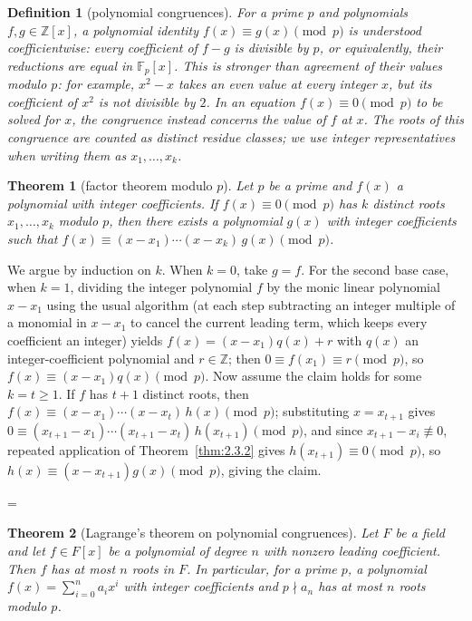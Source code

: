 \documentclass[11pt]{article}
\makeatletter
\theoremstyle{ntstyle}
\newtheorem{theorem}{Theorem}[subsection]
\newtheorem{definition}{Definition}[subsection]
\let\nt@closedisplay\]
\def\nt@guardedclose{\@ifnextchar\par{\nt@closeafterpar}{\@ifnextchar\end{\postdisplaypenalty\@M\nt@closedisplay}{\nt@closedisplay}}}
\def\nt@closeafterpar\par{\@ifnextchar\par{\nt@closeafterpar}{\@ifnextchar\end{\postdisplaypenalty\@M\nt@closedisplay\par}{\nt@closedisplay\par}}}
\renewenvironment{proof}[1][\proofname]{\par
  \pushQED{\qed}\normalfont\topsep\medskipamount\edef\nt@afterproof{\@endparpenalty=\the\@endparpenalty\relax}\@beginparpenalty\@M\@endparpenalty\@M\let\]\nt@guardedclose\trivlist\item[]\textit{#1\@addpunct{.}} \ignorespaces}{\ifvmode\addpenalty\@M\fi\popQED\nt@afterproof\endtrivlist\@endpefalse}
\makeatother
\begin{document}
\begin{definition}[polynomial congruences]\label{def:3.6.1}
	For a prime $p$ and polynomials $f,g\in\mathbb{Z}[x]$, a polynomial identity
	$f(x)\equiv g(x)\pmod{p}$ is understood coefficientwise: every coefficient
	of $f-g$ is divisible by $p$, or equivalently, their reductions are equal
	in $\mathbb{F}_p[x]$. This is stronger than agreement of their values
	modulo $p$: for example, $x^2-x$ takes an even value at every integer $x$, but its
	coefficient of $x^2$ is not divisible by $2$. In an equation
	$f(x)\equiv0\pmod p$ to be solved for $x$, the congruence instead concerns
	the value of $f$ at $x$. The roots of this congruence are counted as distinct residue classes;
	we use integer representatives when writing them as $x_1,\ldots,x_k$.

\end{definition}

\begin{theorem}[factor theorem modulo $p$]\label{thm:3.6.1} Let $p$ be a prime and $f(x)$ a
	polynomial with integer coefficients. If $f(x) \equiv 0 \pmod{p}$ has
	$k$ distinct roots $x_1, \ldots, x_k$ modulo $p$, then there exists a
	polynomial $g(x)$ with integer coefficients such that $f(x) \equiv (x
		- x_1) \cdots (x - x_k)\, g(x) \pmod{p}$.

\end{theorem}

\begin{proof} We argue by induction on $k$. When $k=0$,
	take $g=f$. For the second base case, when $k=1$, dividing the integer
	polynomial $f$ by the monic linear
	polynomial $x - x_1$ using the usual algorithm (at each step subtracting an integer multiple of a monomial in $x - x_1$ to cancel the current leading term, which keeps every coefficient an integer) yields
	$f(x) = (x - x_1) q(x) + r$ with $q(x)$ an integer-coefficient
	polynomial and $r \in \mathbb{Z}$; then $0 \equiv
		f(x_1) \equiv r \pmod{p}$, so $f(x) \equiv (x - x_1) q(x) \pmod{p}$.
	Now assume the claim holds for some $k = t\ge1$. If $f$ has $t+1$
	distinct roots, then $f(x) \equiv (x - x_1) \cdots (x - x_t)\, h(x)
		\pmod{p}$; substituting $x = x_{t+1}$ gives $0 \equiv (x_{t+1} - x_1)
		\cdots (x_{t+1} - x_t)\, h(x_{t+1}) \pmod{p}$, and since $x_{t+1} -
		x_i \not\equiv 0$, repeated application of Theorem~\ref{thm:2.3.2} gives $h(x_{t+1}) \equiv 0 \pmod{p}$, so
	$h(x) \equiv (x - x_{t+1}) g(x) \pmod{p}$, giving the claim.

\end{proof}
\begin{theorem}[Lagrange's theorem on polynomial congruences]\label{thm:3.6.2} Let $F$ be a
	field and let $f\in F[x]$ be a polynomial of degree $n$ with nonzero
	leading coefficient. Then $f$ has at most $n$ roots in $F$. In particular,
	for a prime $p$, a polynomial $f(x)=\sum_{i=0}^{n} a_i x^{i}$ with integer
	coefficients and $p \nmid a_n$ has at most $n$ roots modulo $p$.

\end{theorem}
\end{document}
